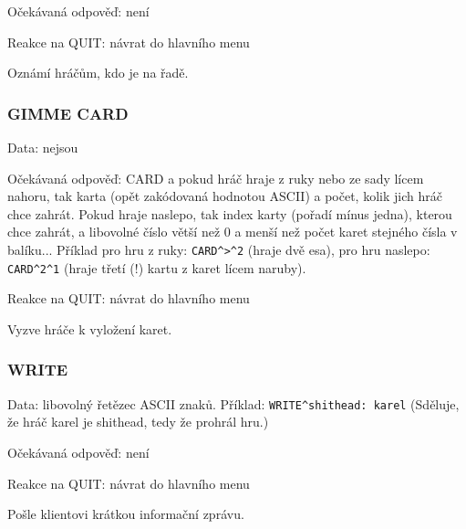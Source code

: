 \documentclass{article}
\begin{document}
Očekávaná odpověď: není 

Reakce na QUIT: návrat do hlavního menu

Oznámí hráčům, kdo je na řadě.

\subsubsection{GIMME CARD}
Data: nejsou 

Očekávaná odpověď: CARD a pokud hráč hraje z ruky nebo ze sady lícem nahoru, tak karta (opět zakódovaná hodnotou ASCII) a počet, kolik jich hráč chce zahrát. Pokud hraje naslepo, tak index karty (pořadí mínus jedna), kterou chce zahrát, a libovolné číslo větší než 0 a menší než počet karet stejného čísla v balíku... Příklad pro hru z ruky: \verb|CARD^>^2| (hraje dvě esa), pro hru naslepo: \verb|CARD^2^1| (hraje třetí (!) kartu z karet lícem naruby).

Reakce na QUIT: návrat do hlavního menu

Vyzve hráče k vyložení karet.

\subsubsection{WRITE}
Data: libovolný řetězec ASCII znaků. Příklad:  \verb|WRITE^shithead: karel|  (Sděluje, že hráč karel je shithead, tedy že prohrál hru.)

Očekávaná odpověď: není 

Reakce na QUIT: návrat do hlavního menu

Pošle klientovi krátkou informační zprávu.
\end{document}
